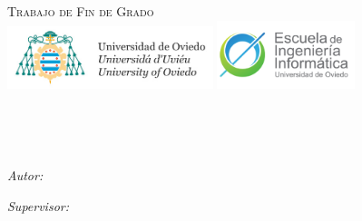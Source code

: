 \documentclass[
11pt, %
spanish, %
singlespacing, %
headsepline, %
]{MastersDoctoralThesis} %
\author{Sergio Arroni Del Riego} %
\begin{document}
\frontmatter %

\pagestyle{plain} %


\begin{titlepage}
\begin{center}

\vspace*{.06\textheight}
{\scshape\LARGE \univname\par}\vspace{1.5cm} %
\textsc{\Large Trabajo de Fin de Grado}\\[0.5cm] %

\includegraphics[width=6cm]{Figures/uniovi.jpg}
\includegraphics[width=4cm]{Figures/eii.png}

\HRule \\[0.4cm] %
{\huge \bfseries \ttitle\par}\vspace{0.4cm} %
\HRule \\[1.5cm] %

\begin{minipage}[t]{0.4\textwidth}
\begin{flushleft} \large
\emph{Autor:}\\
\href{}{\authorname} %
\end{flushleft}
\end{minipage}
\begin{minipage}[t]{0.4\textwidth}
\begin{flushright} \large
\emph{Supervisor:} \\
\href{}{\supname} %
\end{flushright}
\end{minipage}\\[2cm]
 

\end{center}
\end{titlepage}
\end{document}
